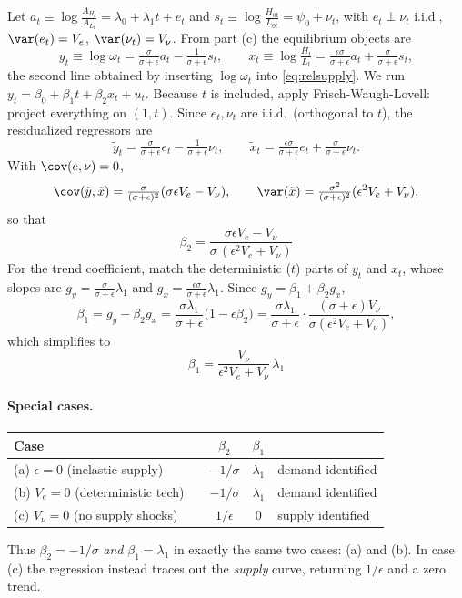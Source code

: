 \documentclass[11pt]{article}
\begin{document}
Let $a_t\equiv\log\frac{A_{H_t}}{A_{L_t}}=\lambda_0+\lambda_1 t+e_t$ and
$s_t\equiv\log\frac{H_{0t}}{L_{0t}}=\psi_0+\nu_t$, with $e_t\perp\nu_t$ i.i.d.,
$\var(e_t)=V_e$, $\var(\nu_t)=V_\nu$. From part (c) the equilibrium objects are
\begin{equation}
y_t\equiv\log\omega_t=\tfrac{\sigma}{\sigma+\epsilon}a_t-\tfrac1{\sigma+\epsilon}s_t,
\qquad
x_t\equiv\log\tfrac{H_t}{L_t}=\tfrac{\epsilon\sigma}{\sigma+\epsilon}a_t
   +\tfrac{\sigma}{\sigma+\epsilon}s_t,
\end{equation}
the second line obtained by inserting $\log\omega_t$ into \eqref{eq:relsupply}.
We run $y_t=\beta_0+\beta_1 t+\beta_2 x_t+u_t$. Because $t$ is included, apply
Frisch-Waugh-Lovell: project everything on $(1,t)$. Since $e_t,\nu_t$ are
i.i.d.\ (orthogonal to $t$), the residualized regressors are
\[
\tilde y_t=\tfrac{\sigma}{\sigma+\epsilon}e_t-\tfrac1{\sigma+\epsilon}\nu_t,
\qquad
\tilde x_t=\tfrac{\epsilon\sigma}{\sigma+\epsilon}e_t+\tfrac{\sigma}{\sigma+\epsilon}\nu_t .
\]
With $\cov(e,\nu)=0$,
\[
\cov(\tilde y,\tilde x)=\tfrac{\sigma}{(\sigma+\epsilon)^2}(\sigma\epsilon V_e-V_\nu),
\qquad
\var(\tilde x)=\tfrac{\sigma^2}{(\sigma+\epsilon)^2}(\epsilon^2 V_e+V_\nu),
\]
so that
\begin{equation}
\boxed{\;\beta_2=\frac{\sigma\epsilon V_e-V_\nu}{\sigma\,(\epsilon^2 V_e+V_\nu)}\;}
\end{equation}
For the trend coefficient, match the deterministic ($t$) parts of $y_t$ and
$x_t$, whose slopes are $g_y=\tfrac{\sigma}{\sigma+\epsilon}\lambda_1$ and
$g_x=\tfrac{\epsilon\sigma}{\sigma+\epsilon}\lambda_1$. Since
$g_y=\beta_1+\beta_2 g_x$,
\[
\beta_1=g_y-\beta_2 g_x
   =\frac{\sigma\lambda_1}{\sigma+\epsilon}\bigl(1-\epsilon\beta_2\bigr)
   =\frac{\sigma\lambda_1}{\sigma+\epsilon}\cdot
    \frac{(\sigma+\epsilon)V_\nu}{\sigma(\epsilon^2V_e+V_\nu)},
\]
which simplifies to
\begin{equation}
\boxed{\;\beta_1=\frac{V_\nu}{\epsilon^2 V_e+V_\nu}\,\lambda_1\;}
\end{equation}

\paragraph{Special cases.}
\begin{center}
\begin{tabular}{lcccl}
\toprule
Case & & $\beta_2$ & $\beta_1$ & \\
\midrule
(a) $\epsilon=0$ (inelastic supply) & & $-1/\sigma$ & $\lambda_1$ & demand identified\\
(b) $V_e=0$ (deterministic tech)    & & $-1/\sigma$ & $\lambda_1$ & demand identified\\
(c) $V_\nu=0$ (no supply shocks)    & & $1/\epsilon$ & $0$ & supply identified\\
\bottomrule
\end{tabular}
\end{center}
Thus $\beta_2=-1/\sigma$ \emph{and} $\beta_1=\lambda_1$ in exactly the same two
cases: (a) and (b). In case (c) the regression instead traces out the
\emph{supply} curve, returning $1/\epsilon$ and a zero trend.
\end{document}
